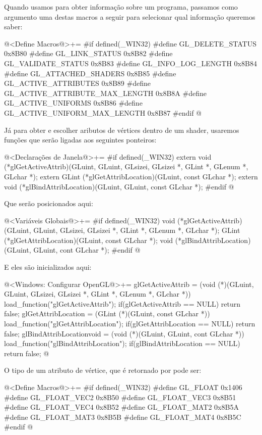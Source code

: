 Quando usamos  para obter informação sobre
um programa, passamos como argumento uma destas macros a seguir para
selecionar qual informação queremos saber:

\iniciocodigo
@<Define Macros@>+=
#if defined(_WIN32)
#define GL_DELETE_STATUS               0x8B80
#define GL_LINK_STATUS                 0x8B82
#define GL_VALIDATE_STATUS             0x8B83
#define GL_INFO_LOG_LENGTH             0x8B84
#define GL_ATTACHED_SHADERS            0x8B85
#define GL_ACTIVE_ATTRIBUTES           0x8B89
#define GL_ACTIVE_ATTRIBUTE_MAX_LENGTH 0x8B8A
#define GL_ACTIVE_UNIFORMS             0x8B86
#define GL_ACTIVE_UNIFORM_MAX_LENGTH   0x8B87
#endif
@
\fimcodigo

Já para obter e escolher aributos de vértices dentro de um shader,
usaremos funções que serão ligadas aos seguintes ponteiros:

\iniciocodigo
@<Declarações de Janela@>+=
#if defined(_WIN32)
extern void (*glGetActiveAttrib)(GLuint, GLuint, GLsizei, GLsizei *, GLint *,
                                 GLenum *, GLchar *);
extern GLint (*glGetAttribLocation)(GLuint, const GLchar *);
extern void (*glBindAttribLocation)(GLuint, GLuint, const GLchar *);
#endif
@
\fimcodigo

Que serão posicionados aqui:

\iniciocodigo
@<Variáveis Globais@>+=
#if defined(_WIN32)
void (*glGetActiveAttrib)(GLuint, GLuint, GLsizei, GLsizei *, GLint *,
                                 GLenum *, GLchar *);
GLint (*glGetAttribLocation)(GLuint, const GLchar *);
void (*glBindAttribLocation)(GLuint, GLuint, cont GLchar *);
#endif
@
\fimcodigo

E eles são inicializados aqui:

\iniciocodigo
@<Windows: Configurar OpenGL@>+=
glGetActiveAttrib = (void (*)(GLuint, GLuint, GLsizei, GLsizei *, GLint *,
                     GLenum *, GLchar *)) load_function("glGetActiveAttrib");
if(glGetActiveAttrib == NULL) return false;
glGetAttribLocation = (GLint (*)(GLuint, const GLchar *))
                           load_function("glGetAttribLocation");
if(glGetAttribLocation == NULL) return false;
glBindAttribLocationvoid = (void (*)(GLuint, GLuint, cont GLchar *))
                              load_function("glBindAttribLocation");
if(glBindAttribLocation == NULL) return false;
@
\fimcodigo

O tipo de um atributo de vértice, que é retornado
por  pode ser:

\iniciocodigo
@<Define Macros@>+=
#if defined(_WIN32)
#define GL_FLOAT      0x1406
#define GL_FLOAT_VEC2 0x8B50
#define GL_FLOAT_VEC3 0x8B51
#define GL_FLOAT_VEC4 0x8B52
#define GL_FLOAT_MAT2 0x8B5A
#define GL_FLOAT_MAT3 0x8B5B
#define GL_FLOAT_MAT4 0x8B5C
#endif
@
\fimcodigo

